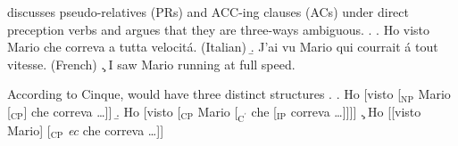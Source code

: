 \documentclass[MilwayThesis]{subfiles}
\begin{document}
\textcite{cinque1996pseudo} discusses pseudo-relatives (PRs) and ACC-ing clauses (ACs) under direct preception verbs and argues that they are three-ways ambiguous.
\ex. 
\a. Ho visto Mario che correva a tutta velocit\'a. (Italian) 
\b. J'ai vu Mario qui courrait \'a tout vitesse. (French)
\c. I saw Mario running at full speed.

According to Cinque, \Last[a] would have three distinct structures 
\ex.
\a. Ho [visto [$_\text{NP}$ Mario [$_\text{CP}$] che correva \ldots ]]
\b. Ho [visto [$_\text{CP}$ Mario [$_{\text{C}^\prime}$ che [$_\text{IP}$ correva \ldots ]]]]
\c. Ho [[visto Mario] [$_\text{CP}$ \textit{ec} che correva \ldots]]
\end{document}
